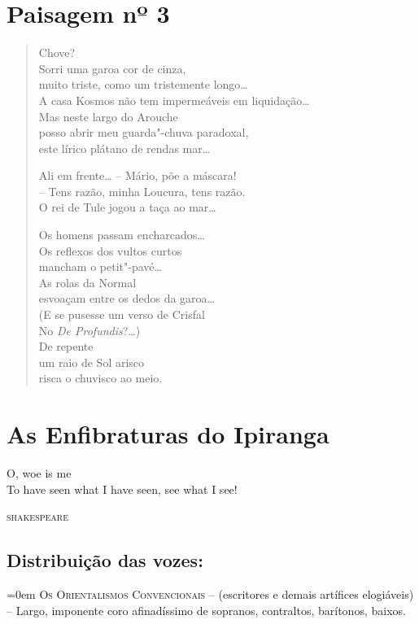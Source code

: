 \chapter{Paisagem nº 3}

\begin{verse}
Chove?\\
Sorri uma garoa cor de cinza,\\
muito triste, como um tristemente longo\ldots{}\\
A casa Kosmos não tem impermeáveis em liquidação\ldots{}\\
Mas neste largo do Arouche\\
posso abrir meu guarda"-chuva paradoxal,\\
este lírico plátano de rendas mar\ldots{}

Ali em frente\ldots{} -- Mário, põe a máscara!\\
-- Tens razão, minha Loucura, tens razão.\\
O rei de Tule jogou a taça ao mar\ldots{}

Os homens passam encharcados\ldots{}\\
Os reflexos dos vultos curtos\\
mancham o petit"-pavé\ldots{}\\
As rolas da Normal\\
esvoaçam entre os dedos da garoa\ldots{}\\
(E se pusesse um verso de Crisfal\\
No \emph{De Profundis}?\ldots{})\\
De repente\\
um raio de Sol arisco\\
risca o chuvisco ao meio.
\end{verse}

\chapter[As Enfibraturas do Ipiranga]{As Enfibraturas do Ipiranga }


{\setlength{\epigraphwidth}{.65\textwidth}
\epigraph{O, woe is me\\
To have seen what I have seen, see what I see!}{\textsc{shakespeare}}}

\section*{Distribuição das vozes:}

\begingroup\parindent=0em
\textsc{Os Orientalismos Convencionais} -- (escritores e demais
artífices elogiáveis) -- Largo, imponente coro afinadíssimo de sopranos,
contraltos, barítonos, baixos.

